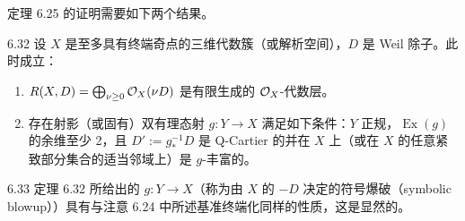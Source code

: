 定理 6.25 的证明需要如下两个结果。

\begin{theorem*}[{[Kaw88]}]{6.32}
设 $X$ 是至多具有终端奇点的三维代数簇（或解析空间），$D$ 是 Weil 除子。此时成立：
\begin{enumerate}[label=（\arabic*）,leftmargin=3.2em]
\item $R(X,D)=\bigoplus_{\nu\ge0}\mathcal{O}_X(\nu D)$ 是有限生成的 $\mathcal{O}_X$-代数层。
\item 存在射影（或固有）双有理态射 $g:Y\to X$ 满足如下条件：$Y$ 正规，$\operatorname{Ex}(g)$ 的余维至少 2，且 $D':=g_*^{-1}D$ 是 Q-Cartier 的并在 $X$ 上（或在 $X$ 的任意紧致部分集合的适当邻域上）是 $g$-丰富的。
\end{enumerate}
\end{theorem*}


\begin{remark}{6.33}
定理 6.32 所给出的 $g:Y\to X$（称为由 $X$ 的 $-D$ 决定的符号爆破（symbolic blowup））具有与注意 6.24 中所述基准终端化同样的性质，这是显然的。
\end{remark}
